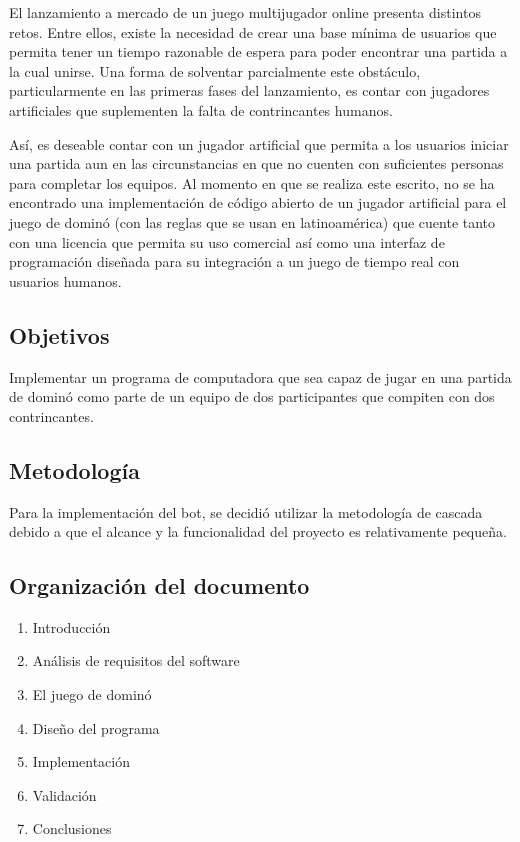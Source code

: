 El lanzamiento a mercado de un juego multijugador online presenta distintos
retos. Entre ellos, existe la necesidad de crear una base mínima de usuarios que
permita tener un tiempo razonable de espera para poder encontrar una partida a
la cual unirse. Una forma de solventar parcialmente este obstáculo,
particularmente en las primeras fases del lanzamiento, es contar con jugadores
artificiales que suplementen la falta de contrincantes humanos.

Así, es deseable contar con un jugador artificial que permita a los usuarios
iniciar una partida aun en las circunstancias en que no cuenten con suficientes
personas para completar los equipos. Al momento en que se realiza este escrito,
no se ha encontrado una implementación de código abierto de un jugador
artificial para el juego de dominó (con las reglas que se usan en latinoamérica)
que cuente tanto con una licencia que permita su uso comercial así como una
interfaz de programación diseñada para su integración a un juego de tiempo real
con usuarios humanos.



\subsection{Objetivos}

Implementar un programa de computadora que sea capaz de jugar en una partida de
dominó como parte de un equipo de dos participantes que compiten con dos
contrincantes.

\subsection{Metodología}

Para la implementación del bot, se decidió utilizar la metodología de cascada
debido a que el alcance y la funcionalidad del proyecto es relativamente
pequeña.

\subsection{Organización del documento}
\begin{enumerate}
    \item Introducción
    \item Análisis de requisitos del software
    \item El juego de dominó
    \item Diseño del programa
    \item Implementación
    \item Validación
    \item Conclusiones
\end{enumerate}



